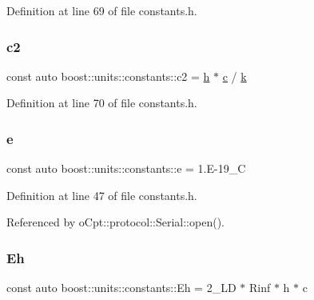 Definition at line 69 of file constants.\+h.

\hypertarget{namespaceboost_1_1units_1_1constants_a2937e386d51a9ac493a9ea7131d1a792}{}\label{namespaceboost_1_1units_1_1constants_a2937e386d51a9ac493a9ea7131d1a792} 
\subsubsection{\texorpdfstring{c2}{c2}}
{\footnotesize\ttfamily const auto boost\+::units\+::constants\+::c2 = \hyperlink{namespaceboost_1_1units_1_1constants_a744f5a50efb6701fcbde9527affd7776}{h} $\ast$ \hyperlink{namespaceboost_1_1units_1_1constants_a1e4c07de84b2d43e7717eaada50b32de}{c} / \hyperlink{namespaceboost_1_1units_1_1constants_aaa1646309f48431cdde13c0c78b18b44}{k}}



Definition at line 70 of file constants.\+h.

\hypertarget{namespaceboost_1_1units_1_1constants_a0e10024b337b34c7f7300c67f0e9fcb1}{}\label{namespaceboost_1_1units_1_1constants_a0e10024b337b34c7f7300c67f0e9fcb1} 
\subsubsection{\texorpdfstring{e}{e}}
{\footnotesize\ttfamily const auto boost\+::units\+::constants\+::e = 1.\+E-\/19\+\_\+C}



Definition at line 47 of file constants.\+h.



Referenced by o\+Cpt\+::protocol\+::\+Serial\+::open().

\hypertarget{namespaceboost_1_1units_1_1constants_a964f6e0e95c9cbf2ae5808774ae7411a}{}\label{namespaceboost_1_1units_1_1constants_a964f6e0e95c9cbf2ae5808774ae7411a} 
\subsubsection{\texorpdfstring{Eh}{Eh}}
{\footnotesize\ttfamily const auto boost\+::units\+::constants\+::\+Eh = 2\+\_\+\+L\+D $\ast$ Rinf $\ast$ h $\ast$ c}



